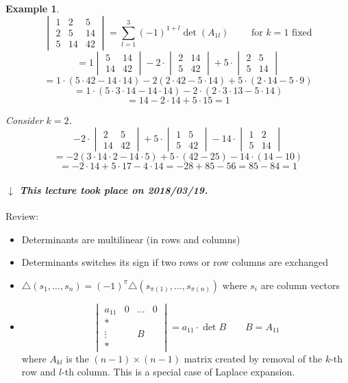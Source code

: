 \documentclass{article}
\newcounter{lecref}[section]
\numberwithin{lecref}{section}
\newtheorem{example}[lecref]{Example}
\newcommand{\dateref}[1]{%
  \begin{mdframed}[backgroundcolor=gray!10,innerbottommargin=0pt,innertopmargin=0pt]
    \paragraph{\textit{$\downarrow$ This lecture took place on #1.}}%
  \end{mdframed}%
}
\begin{document}
\begin{example} %
  \[
    \begin{vmatrix}
      1 & 2 & 5 \\
      2 & 5 & 14 \\
      5 & 14 & 42
    \end{vmatrix}
    = \sum_{l=1}^3 (-1)^{1+l} \det(A_{1l})
    \qquad \text{ for $k=1$ fixed}
  \]
  \[ = 1 \begin{vmatrix} 5 & 14 \\ 14 & 42 \end{vmatrix} - 2 \cdot \begin{vmatrix} 2 & 14 \\ 5 & 42 \end{vmatrix} + 5 \cdot \begin{vmatrix} 2 & 5 \\ 5 & 14 \end{vmatrix} \]
  \[ = 1 \cdot (5 \cdot 42 - 14 \cdot 14) - 2 (2 \cdot 42 - 5 \cdot 14) + 5 \cdot (2 \cdot 14 - 5 \cdot 9) \]
  \[ = 1 \cdot (5 \cdot 3 \cdot 14 - 14 \cdot 14) - 2 \cdot (2 \cdot 3 \cdot 13 - 5 \cdot 14) \]
  \[ = 14 - 2 \cdot 14 + 5 \cdot 15 = 1 \]

  Consider $k=2$.
  \[
    -2 \cdot \begin{vmatrix} 2 & 5 \\ 14 & 42 \end{vmatrix} + 5 \cdot \begin{vmatrix} 1 & 5 \\ 5 & 42 \end{vmatrix} - 14 \cdot \begin{vmatrix} 1 & 2 \\ 5 & 14 \end{vmatrix}
  \] \[
    = -2 (3 \cdot 14 \cdot 2 - 14 \cdot 5) + 5 \cdot (42 - 25) - 14 \cdot (14 - 10)
  \] \[
    = -2 \cdot 14 + 5 \cdot 17 - 4 \cdot 14 = -28 +85 -56 = 85 - 84 = 1
  \]
\end{example}

\dateref{2018/03/19}

Review:
\begin{itemize}
  \item Determinants are multilinear (in rows and columns)
  \item Determinants switches its sign if two rows or row columns are exchanged
  \item $\triangle(s_1, \dots, s_n) = (-1)^\pi \triangle(s_{\pi(1)}, \dots, s_{\pi(n)})$ where $s_i$ are column vectors
  \item
    \[
      \begin{vmatrix}
        a_{11} & 0 & \dots & 0 \\
        * &        &       & \\
        \vdots &   &  B    & \\
        * &        &       &
      \end{vmatrix}
      = a_{11} \cdot \det{B}
      \qquad B = A_{11}
    \]
    where $A_{kl}$ is the $(n-1) \times (n-1)$ matrix created by removal of the $k$-th row and $l$-th column.
    This is a special case of Laplace expansion.
\end{itemize}
\end{document}
